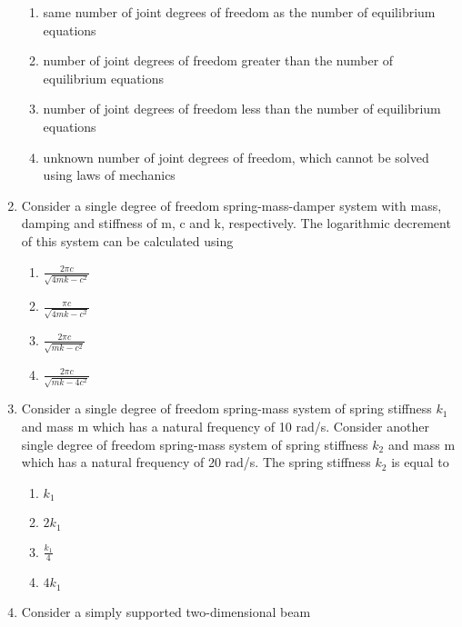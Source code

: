 \documentclass[journal]{IEEEtran}
\numberwithin{equation}{enumi}
\numberwithin{figure}{enumi}
\begin{document}
\begin{enumerate}
	\begin{enumerate}
		\item same number of joint degrees of freedom as the number of equilibrium equations
		\item number of joint degrees of freedom greater than the number of equilibrium equations
		\item number of joint degrees of freedom less than the number of equilibrium equations
		\item unknown number of joint degrees of freedom, which cannot be solved using laws of mechanics
	\end{enumerate}
\item Consider a single degree of freedom spring-mass-damper system with mass, damping and stiffness of m, c and k, respectively. The logarithmic decrement of this system can be calculated using
	\begin{enumerate}
		\item $\frac{2\pi c}{\sqrt{4mk - c^2}}$
		\item $\frac{\pi c}{\sqrt{4mk - c^2}}$
		\item $\frac{2\pi c}{\sqrt{mk - c^2}}$
		\item $\frac{2\pi c}{\sqrt{mk - 4c^2}}$
	\end{enumerate}
\item Consider a single degree of freedom spring-mass system of spring stiffness $k_1$ and mass m which has a natural frequency of 10 rad/s. Consider another single degree of freedom spring-mass system of spring stiffness $k_2$ and mass m which has a natural frequency of 20 rad/s. The spring stiffness $k_2$ is equal to
	\begin{enumerate}
		\item $k_1$
		\item $2k_1$
		\item $\frac{k_1}{4}$
		\item $4k_1$
	\end{enumerate}
\item Consider a simply supported two-dimensional beam
	\begin{figure}[H]
		\centering
\end{figure}
\end{enumerate}
\end{document}
